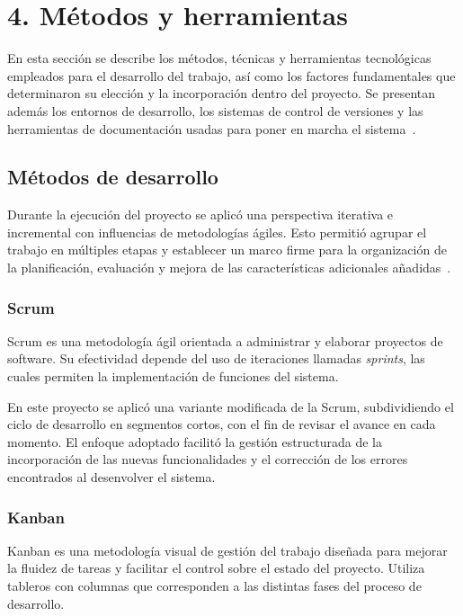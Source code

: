 \chapter{4. Métodos y herramientas}

En esta sección se describe los métodos, técnicas y herramientas tecnológicas empleados para el desarrollo del trabajo, así como los factores fundamentales que determinaron su elección y la incorporación dentro del proyecto. Se presentan además los entornos de desarrollo, los sistemas de control de versiones y las herramientas de documentación usadas para poner en marcha el sistema~\cite{pressman2005}.

\section{Métodos de desarrollo}

Durante la ejecución del proyecto se aplicó una perspectiva iterativa e incremental con influencias de metodologías ágiles. Esto permitió agrupar el trabajo en múltiples etapas y establecer un marco firme para la organización de la planificación, evaluación y mejora de las características adicionales añadidas~\cite{pressman2005}.

\subsection{Scrum}

Scrum es una metodología ágil orientada a administrar y elaborar proyectos de software. Su efectividad depende del uso de iteraciones llamadas \textit{sprints}, las cuales permiten la implementación de funciones del sistema.

En este proyecto se aplicó una variante modificada de la Scrum, subdividiendo el ciclo de desarrollo en segmentos cortos, con el fin de revisar el avance en cada momento. El enfoque adoptado facilitó la gestión estructurada de la incorporación de las nuevas funcionalidades y el corrección de los errores encontrados al desenvolver el sistema.

\subsection{Kanban}

Kanban es una metodología visual de gestión del trabajo diseñada para mejorar la fluidez de tareas y facilitar el control sobre el estado del proyecto. Utiliza tableros con columnas que corresponden a las distintas fases del proceso de desarrollo.


